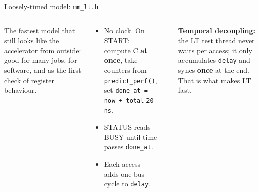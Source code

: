 \documentclass[aspectratio=169,11pt]{beamer}
\newcommand{\file}[1]{\texttt{\textcolor{copper}{#1}}}
\newcommand{\sig}[1]{\texttt{#1}}
\begin{document}
\begin{frame}{Loosely-timed model: \file{mm\_lt.h}}
  \begin{columns}[T]
    \begin{why}
      The fastest model that still looks like the accelerator from outside: good for many jobs,
      for software, and as the first check of register behaviour.
    \end{why}
    \begin{how}
      \begin{itemize}
        \item No clock. On START: compute C \textbf{at once}, take counters from
              \sig{predict\_perf()}, set \sig{done\_at = now + total$\cdot$20\,ns}.
        \item STATUS reads BUSY until time passes \sig{done\_at}.
        \item Each access adds one bus cycle to \sig{delay}.
      \end{itemize}
    \end{how}
    \centering
    \\[1mm]
    \footnotesize\raggedright\textbf{Temporal decoupling:} the LT test thread never waits per access;
    it only accumulates \sig{delay} and syncs \textbf{once} at the end. That is what makes LT fast.
  \end{columns}
\end{frame}
\end{document}
